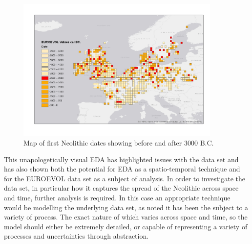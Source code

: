 \begin{figure}
\begin{center}
	\includegraphics[width=0.9\textwidth]{figures/euroevol-late-neo}
\end{center}
  \caption{Map of first Neolithic dates showing before and after 3000 B.C.}
  \label{fig:euroevol-laten}
\end{figure}

This unapologetically visual EDA has highlighted issues with the data set and has also shown both the potential for EDA as a spatio-temporal technique and for the EUROEVOL data set as a subject of analysis. In order to investigate the data set, in particular how it captures the spread of the Neolithic across space and time, further analysis is required. In this case an appropriate technique would be modelling the underlying data set, as noted it has been the subject to a variety of process. The exact nature of which varies across space and time, so the model should either be extremely detailed, or capable of representing a variety of processes and uncertainties through abstraction.

